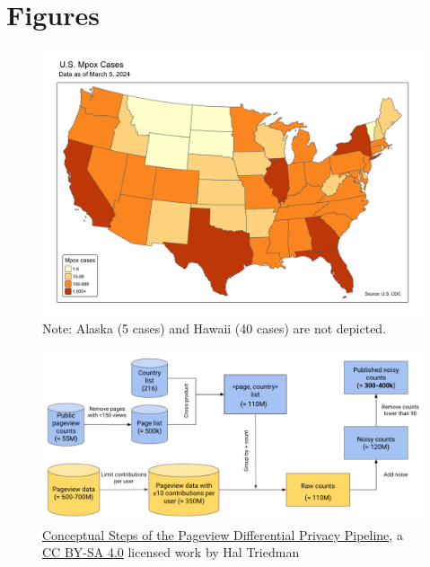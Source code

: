 \documentclass[
  12pt,
]{article}
\begin{document}
\section{Figures}\label{figures}

\begin{figure}[H]

{\centering \includegraphics{images/mpox-cases-USA-states-map.png}

}

\caption{Note: Alaska (5 cases) and Hawaii (40 cases) are not depicted.}

\end{figure}%
\begin{figure}[H]

{\centering \includegraphics{images/wiki-pageview-differential-privacy-pipeline.jpg}

}

\caption{\href{https://diff.wikimedia.org/2023/06/21/new-dataset-uncovers-wikipedia-browsing-habits-while-protecting-users/screenshot-2023-05-23-at-10-34-18-am/}{Conceptual
Steps of the Pageview Differential Privacy Pipeline}, a
\href{https://creativecommons.org/licenses/by-sa/4.0/}{CC BY-SA 4.0}
licensed work by Hal Triedman}

\end{figure}%
\end{document}
